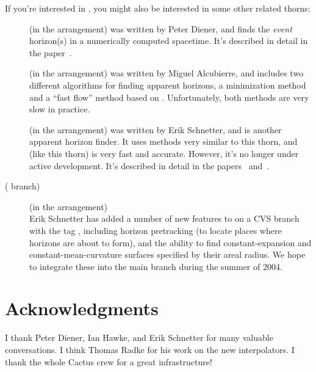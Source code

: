 If you're interested in , you might also be
interested in some other related thorns:

\begin{description}
\item[] (in the  arrangement)
	was written by Peter Diener, and finds the {\em event\/} horizon(s)
	in a numerically computed spacetime.  It's described in detail in
	the paper~\cite{AHFinderDirect/Diener03a}.
\item[] (in the  arrangement)
	was written by Miguel Alcubierre, and includes two different
	algorithms for finding apparent horizons, a minimization method
	and a ``fast flow'' method based on \cite{AHFinderDirect/Gundlach97a}.
	Unfortunately, both methods are very slow in practice.
\item[] (in the  arrangement)
	was written by Erik Schnetter, and is another apparent horizon
	finder.  It uses methods very similar to this thorn, and (like
	this thorn) is very fast and accurate.  However, it's no longer
	under active development.  It's described in detail in the
	papers~\cite{AHFinderDirect/Schnetter02a}
	and~\cite{AHFinderDirect/Schnetter03a}.
\item[ ( branch)]
      (in the  arrangement)\\
	Erik Schnetter has added a number of new features to
	 on a CVS branch with the tag ,
	including horizon pretracking (to locate places where horizons
	are about to form), and the ability to find constant-expansion
	and constant-mean-curvature surfaces specified by their areal radius.
	We hope to integrate these into the main 
	branch during the summer of 2004.
\end{description}


\section{Acknowledgments}

I thank Peter Diener, Ian Hawke, and Erik Schnetter for many valuable
conversations.  I think Thomas Radke for his work on the new interpolators.
I thank the whole Cactus crew for a great infrastructure!

